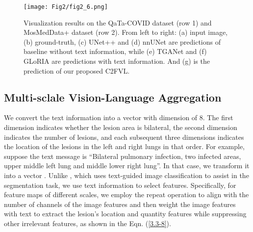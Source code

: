 \documentclass{article}
\begin{document}
\begin{figure*}[!ht]
{\begin{minipage}[t]{0.135\linewidth}
			\vspace{0.02cm}
			\texttt{[image: Fig2/fig2\_6.png]}\\
			\vspace{0.02cm}
		\end{minipage}}
\centering
	\caption{Visualization results on the QaTa-COVID dataset (row 1) and MosMedData+ dataset (row 2). From left to right: (a) input image, (b) ground-truth, (c) UNet++ and (d) nnUNet are predictions of baseline without text information, while (e) TGANet and (f) GLoRIA are predictions with text information. And (g) is the prediction of our proposed C2FVL.}
	\label{visfig}
	\vspace{-0.4cm}
	\label{vis}
\end{figure*}
\vspace{-4mm}
\subsection{Multi-sclale Vision-Language Aggregation}
\vspace{-2mm}
We convert the text information into a vector with dimension of 8. The first dimension indicates whether the lesion area is bilateral, the second dimension indicates the number of lesions, and each subsequent three dimensions indicates the location of the lesions in the left and right lungs in that order. For example, suppose the text message is ``Bilateral pulmonary infection, two infected areas, upper middle left lung and middle lower right lung''. In that case, we transform it into a vector . Unlike \cite{tomar2022tganet}, which uses text-guided image classification to assist in the segmentation task, we use text information to select features. Specifically, for feature maps of different scales, we employ the repeat operation to align  with the number of channels of the image features and then weight the image features with text to extract the lesion's location and quantity features while suppressing other irrelevant features, as shown in the Eqn. (\ref{3.3-8}).
\vspace{-2mm}
\end{document}

